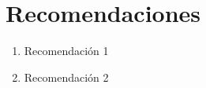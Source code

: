 \chapter*{Recomendaciones}
\begin{enumerate}
\item Recomendación 1
\item Recomendación 2
\end{enumerate}

